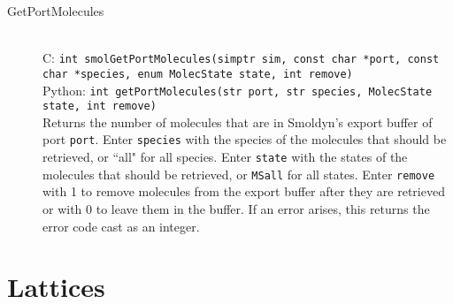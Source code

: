 \documentclass {book}
\newcommand {\ttt} {\texttt}
\begin{document}
\begin{description}
\item[GetPortMolecules]
\hfill \\
C: \ttt{int smolGetPortMolecules(simptr sim, const char *port, const char *species, enum MolecState state, int remove)}\\
Python: \ttt{int getPortMolecules(str port, str species, MolecState state, int remove)}\\
Returns the number of molecules that are in Smoldyn's export buffer of port \ttt{port}. Enter \ttt{species} with the species of the molecules that should be retrieved, or ``all" for all species. Enter \ttt{state} with the states of the molecules that should be retrieved, or \ttt{MSall} for all states. Enter \ttt{remove} with 1 to remove molecules from the export buffer after they are retrieved or with 0 to leave them in the buffer. If an error arises, this returns the error code cast as an integer.

\end{description}


\section{Lattices}
\end{document}
